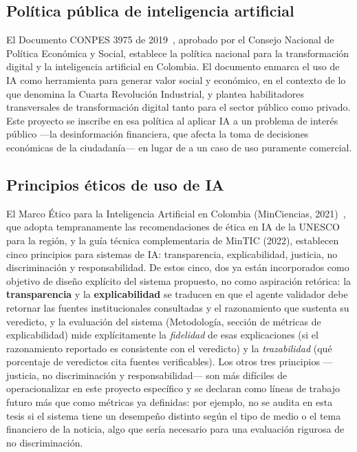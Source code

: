 \subsection{Política pública de inteligencia artificial}

El Documento CONPES 3975 de 2019~\cite{CONPES3975}, aprobado por el Consejo Nacional de Política Económica y Social, establece la política nacional para la transformación digital y la inteligencia artificial en Colombia. El documento enmarca el uso de IA como herramienta para generar valor social y económico, en el contexto de lo que denomina la Cuarta Revolución Industrial, y plantea habilitadores transversales de transformación digital tanto para el sector público como privado. Este proyecto se inscribe en esa política al aplicar IA a un problema de interés público —la desinformación financiera, que afecta la toma de decisiones económicas de la ciudadanía— en lugar de a un caso de uso puramente comercial.

\subsection{Principios éticos de uso de IA}

El Marco Ético para la Inteligencia Artificial en Colombia (MinCiencias, 2021)~\cite{MarcoEticoIA2021}, que adopta tempranamente las recomendaciones de ética en IA de la UNESCO para la región, y la guía técnica complementaria de MinTIC (2022), establecen cinco principios para sistemas de IA: transparencia, explicabilidad, justicia, no discriminación y responsabilidad. De estos cinco, dos ya están incorporados como objetivo de diseño explícito del sistema propuesto, no como aspiración retórica: la \textbf{transparencia} y la \textbf{explicabilidad} se traducen en que el agente validador debe retornar las fuentes institucionales consultadas y el razonamiento que sustenta su veredicto, y la evaluación del sistema (Metodología, sección de métricas de explicabilidad) mide explícitamente la \textit{fidelidad} de esas explicaciones (si el razonamiento reportado es consistente con el veredicto) y la \textit{trazabilidad} (qué porcentaje de veredictos cita fuentes verificables). Los otros tres principios —justicia, no discriminación y responsabilidad— son más difíciles de operacionalizar en este proyecto específico y se declaran como líneas de trabajo futuro más que como métricas ya definidas: por ejemplo, no se audita en esta tesis si el sistema tiene un desempeño distinto según el tipo de medio o el tema financiero de la noticia, algo que sería necesario para una evaluación rigurosa de no discriminación.

